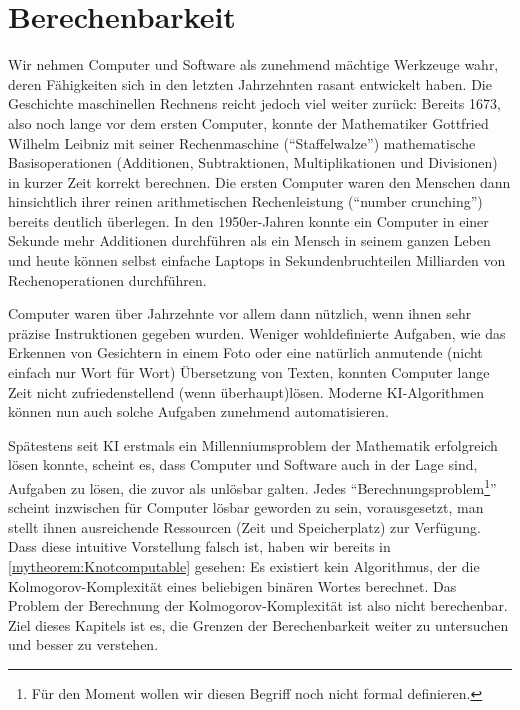 \chapter{Berechenbarkeit}\label{chapter:berechenbarkeit}

Wir nehmen Computer und Software als zunehmend mächtige Werkzeuge wahr, deren Fähigkeiten sich in den letzten Jahrzehnten rasant entwickelt haben.
Die Geschichte maschinellen Rechnens reicht jedoch viel weiter zurück: Bereits 1673, also noch lange vor dem ersten Computer, konnte der Mathematiker Gottfried Wilhelm Leibniz mit seiner Rechenmaschine (\enquote{Staffelwalze}) mathematische Basisoperationen (Additionen, Subtraktionen, Multiplikationen und Divisionen) in kurzer Zeit korrekt berechnen.
Die ersten Computer waren den Menschen dann hinsichtlich ihrer reinen arithmetischen Rechenleistung (\enquote{number crunching}) bereits deutlich überlegen. In den 1950er-Jahren konnte ein Computer in einer Sekunde mehr Additionen durchführen als ein Mensch in seinem ganzen Leben und 
heute können selbst einfache Laptops in Sekundenbruchteilen Milliarden von Rechenoperationen durchführen.

Computer waren über Jahrzehnte vor allem dann nützlich, wenn ihnen sehr präzise Instruktionen gegeben wurden. Weniger wohldefinierte Aufgaben, wie das Erkennen von Gesichtern in einem Foto oder eine natürlich anmutende (nicht einfach nur Wort für Wort) Übersetzung von Texten, konnten Computer lange Zeit nicht zufriedenstellend (wenn überhaupt)lösen. Moderne \acrshort{KI}-Algorithmen können nun auch solche Aufgaben zunehmend automatisieren.

Spätestens seit \gls{KI} erstmals ein Millenniumsproblem der Mathematik erfolgreich lösen konnte, scheint es, dass Computer und Software auch in der Lage sind, Aufgaben zu lösen, die zuvor als unlösbar galten. Jedes \enquote{Berechnungsproblem\footnote{Für den Moment wollen wir diesen Begriff noch nicht formal definieren.}} scheint inzwischen für Computer lösbar geworden zu sein, vorausgesetzt, man stellt ihnen ausreichende Ressourcen (Zeit und Speicherplatz) zur Verfügung. Dass diese intuitive Vorstellung falsch ist, haben wir bereits in \cref{mytheorem:Knotcomputable} gesehen: Es existiert kein Algorithmus, der die Kolmogorov-Komplexität eines beliebigen binären Wortes berechnet. Das Problem der Berechnung der Kolmogorov-Komplexität ist also nicht berechenbar. Ziel dieses Kapitels ist es, die Grenzen der Berechenbarkeit weiter zu untersuchen und besser zu verstehen.


